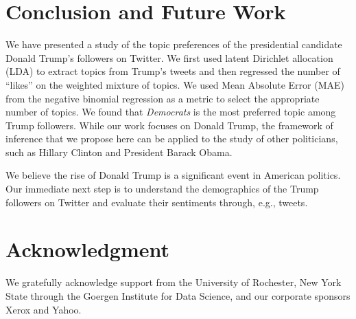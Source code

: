\documentclass[letterpaper]{article}
\begin{document}


\section{Conclusion and Future Work}
We have presented a study of the topic preferences of the presidential candidate Donald Trump's followers on Twitter. We first used latent Dirichlet allocation (LDA) to extract topics from Trump's tweets and then regressed the number of ``likes'' on the weighted mixture of topics. We used Mean Absolute Error (MAE) from the negative binomial regression as a metric to select the appropriate number of topics. We found that \textit{Democrats} is the most preferred topic among Trump followers. While our work focuses on Donald Trump, the framework of inference that we propose here can be applied to the study of other politicians, such as Hillary Clinton and President Barack Obama.

We believe the rise of Donald Trump is a significant event in American politics. Our immediate next step is to understand the demographics of the Trump followers on Twitter and evaluate their sentiments through, e.g., tweets.

\section{Acknowledgment}
We gratefully acknowledge support from the University of Rochester, New York State through the Goergen Institute for Data Science, and our corporate sponsors Xerox and Yahoo.
\end{document}
